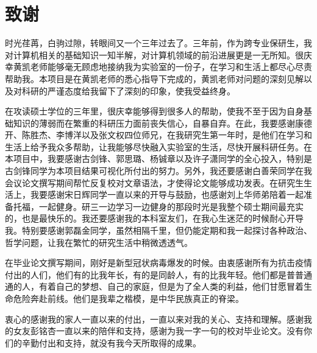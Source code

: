

\chapter*{致\quad 谢}
时光荏苒，白驹过隙，转眼间又一个三年过去了。三年前，作为跨专业保研生，我对计算机相关的基础知识一知半解，对计算机领域的前沿进展更是一无所知。很庆幸黄凯老师能够毫无顾虑地接纳我为实验室的一份子，在学习和生活上都尽心尽责帮助我。本项目是在黄凯老师的悉心指导下完成的，黄凯老师对问题的深刻见解以及对科研的严谨态度给我留下了深刻的印象，使我受益终身。

在攻读硕士学位的三年里，很庆幸能够得到很多人的帮助，使我不至于因为自身基础知识的薄弱而在繁重的科研压力面前丧失信心，自暴自弃。在此，我要感谢康德开、陈胜杰、李博洋以及张文权四位师兄，在我研究生第一年时，是他们在学习和生活上给予我众多帮助，让我能够尽快融入实验室的生活，尽快开展科研任务。在本项目中，我要感谢古剑锋、郭思璐、杨铖章以及许子潇同学的全心投入，特别是古剑锋同学为本项目结果可视化所付出的努力。另外，我还要感谢白善荣同学在我会议论文撰写期间帮忙反复校对文章语法，才使得论文能够成功发表。在研究生生活上，我要感谢宋日辉同学一直以来的开导与鼓励，也感谢刘上华师弟陪着一起准备托福，一起健身。研三一边学习一边健身的那段时光是我整个硕士期间最充实的，也是最快乐的。我还要感谢我的本科室友们，在我心生迷茫的时候耐心开导我。特别要感谢郭磊金同学，虽然相隔千里，但仍能定期和我一起探讨各种政治、哲学问题，让我在繁忙的研究生活中稍微透透气。%

在毕业论文撰写期间，刚好是新型冠状病毒爆发的时候。由衷感谢所有为抗击疫情付出的人们，他们有的比我年长，有的是同龄人，有的比我年轻。他们都是普普通通的人，有着自己的梦想、自己的家庭，但是为了全人类的利益，他们甘愿冒着生命危险奔赴前线。他们是我辈之楷模，是中华民族真正的脊梁。

衷心的感谢我的家人一直以来的付出，一直以来对我的关心、支持和理解。感谢我的女友彭铭杏一直以来的陪伴和支持，感谢为我一字一句的校对毕业论文。没有你们的辛勤付出和支持，就没有我今天所取得的成果。


\maketime

